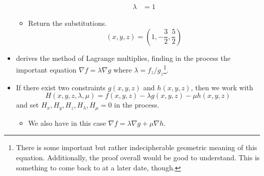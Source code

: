 \documentclass[../main.tex]{subfiles}
\begin{document}
\begin{itemize}
\begin{itemize}
\begin{align*}
            \lambda &= 1
        \end{align*}
        \item Return the substitutions.
        \begin{equation*}
            (x,y,z) = \left( 1,-\frac{3}{2},\frac{5}{2} \right)
        \end{equation*}
    \end{itemize}
    \item \cite{bib:Thomas} derives the method of Lagrange multiplies, finding in the process the important equation $\nabla f=\lambda\nabla g$ where $\lambda=f_z/g_z$\footnote{There is some important but rather indecipherable geometric meaning of this equation. Additionally, the proof overall would be good to understand. This is something to come back to at a later date, though.}.
    \item If there exist two constraints $g(x,y,z)$ and $h(x,y,z)$, then we work with
    \begin{equation*}
        H(x,y,z,\lambda,\mu) = f(x,y,z)-\lambda g(x,y,z)-\mu h(x,y,z)
    \end{equation*}
    and set $H_x,H_y,H_z,H_\lambda,H_\mu=0$ in the process.
    \begin{itemize}
        \item We also have in this case $\nabla f=\lambda\nabla g+\mu\nabla h$.
    \end{itemize}
\end{itemize}
\end{document}
